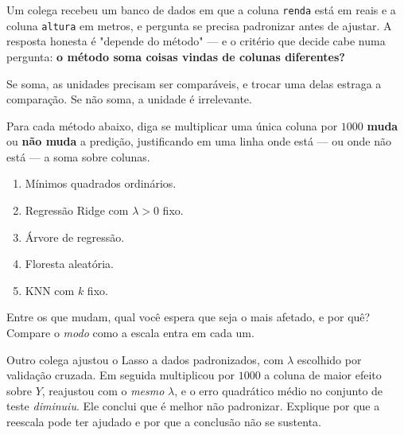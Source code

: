 Um colega recebeu um banco de dados em que a coluna \texttt{renda} está em reais e a coluna
\texttt{altura} em metros, e pergunta se precisa padronizar antes de ajustar. A
resposta honesta é "depende do método" --- e o critério que decide cabe numa
pergunta: \textbf{o método soma coisas vindas de colunas diferentes?}

Se soma, as unidades precisam ser comparáveis, e trocar uma delas estraga a
comparação. Se não soma, a unidade é irrelevante.
\begin{itens}
  \item {} Para cada método abaixo, diga se multiplicar uma
        única coluna por $1000$ \textbf{muda} ou \textbf{não muda} a predição,
        justificando em uma linha onde está --- ou onde não está --- a soma sobre
        colunas.
        \begin{enumerate}[label=(\roman*),leftmargin=1.0cm,nosep]
          \item Mínimos quadrados ordinários.
          \item Regressão Ridge com $\lambda>0$ fixo.
          \item Árvore de regressão.
          \item Floresta aleatória.
          \item KNN com $k$ fixo.
        \end{enumerate}
  \item {} Entre os que mudam, qual você espera que seja o mais afetado, e
        por quê? Compare o \emph{modo} como a escala entra em cada um.
  \item {} Outro colega ajustou o Lasso a dados padronizados, com $\lambda$
        escolhido por validação cruzada. Em seguida multiplicou por $1000$ a coluna
        de maior efeito sobre $Y$, reajustou com o \emph{mesmo} $\lambda$, e o erro
        quadrático médio no conjunto de teste \emph{diminuiu}. Ele conclui que é
        melhor não padronizar. Explique por que a reescala pode ter ajudado e por
        que a conclusão não se sustenta.
\end{itens}

